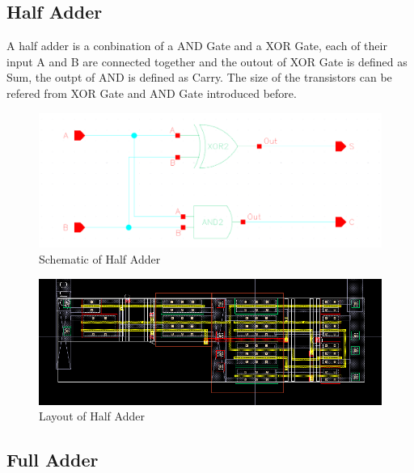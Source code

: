 \documentclass[conference]{IEEEtran}
\begin{document}
\subsection{Half Adder}


A half adder is a conbination of a AND Gate and a XOR Gate, each of their input A and B are connected together and the outout of XOR Gate is defined as Sum, the outpt of AND is defined as Carry. The size of the transistors can be refered from XOR Gate and AND Gate introduced before.

\begin{figure}[H]
    \centering
    \includegraphics[width = 0.9\linewidth]{half_adder_schematic.png}
    \caption{Schematic of Half Adder}
    \label{Schematic of Half Adder}
\end{figure}

\begin{figure}[H]
    \centering
    \includegraphics[width = 0.3\linewidth]{half_adder_layout.png}
    \caption{Layout of Half Adder}
    \label{Layout of Half Adder}
\end{figure}
  
\subsection{Full Adder}

\end{document}
